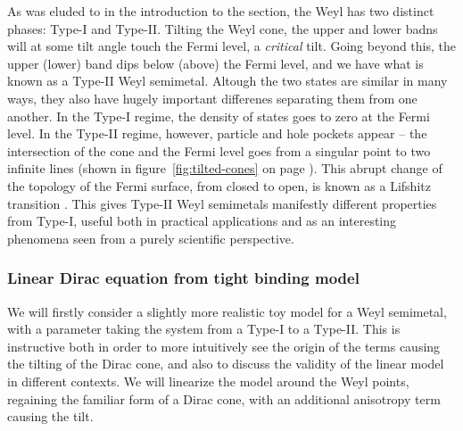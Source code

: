 As was eluded to in the introduction to the section, the Weyl has two distinct phases: Type-I and
Type-II.
Tilting the Weyl cone, the upper and lower badns will at some tilt angle touch the Fermi level, a \emph{critical} tilt.
Going beyond this, the upper (lower) band dips below (above) the Fermi level, and we have what is known as a Type-II Weyl semimetal.
Altough the two states are similar in many ways, they also have hugely important differenes separating them from one another.
In the Type-I regime, the density of states goes to zero at the Fermi level.
In the Type-II regime, however, particle and hole pockets appear -- the intersection of the cone and the Fermi level goes from a singular point to two infinite lines (shown in figure~\ref{fig:tilted-cones} on page \pageref{fig:tilted-cones}).
This abrupt change of the topology of the Fermi surface, from closed to open, is known as a Lifshitz transition \cite{volovikTopologicalLifshitzTransitions2017}.
This gives Type-II Weyl semimetals manifestly different properties from Type-I, useful both in practical applications and as an interesting phenomena seen from a purely scientific perspective.


\subsubsection{Linear Dirac equation from tight binding model}
\label{sec:tilt:tightbindingmodel}
We will firstly consider a slightly more realistic toy model for a Weyl semimetal, with a parameter taking the system from a Type-I to a Type-II.
This is instructive both in order to more intuitively see the origin of the terms causing the tilting of the Dirac cone, and also to discuss the validity of the linear model in different contexts.
We will linearize the model around the Weyl points, regaining the familiar form of a Dirac cone, with an additional anisotropy term causing the tilt.

